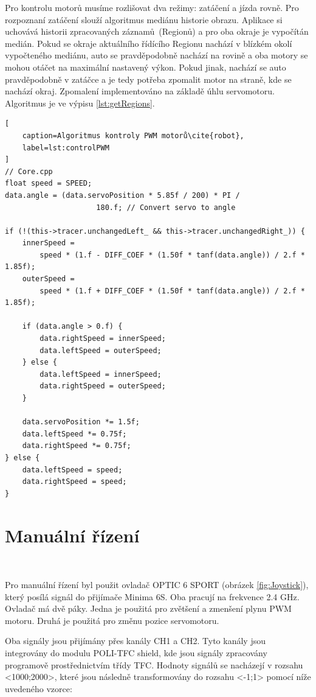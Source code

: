 Pro kontrolu motorů musíme rozlišovat dva režimy: zatáčení a jízda rovně.
Pro rozpoznaní zatáčení slouží algoritmus mediánu historie obrazu.
Aplikace si uchovává historii zpracovaných záznamů~(Regionů) a pro oba
okraje je vypočítán medián. Pokud se okraje aktuálního řídícího Regionu nachází
v blízkém okolí vypočteného mediánu, auto se pravděpodobně
nachází na rovině a oba motory se mohou otáčet na maximální nastavený výkon.
Pokud jinak, nachází se auto pravděpodobně v zatáčce a je tedy potřeba zpomalit
motor na straně, kde se nachází okraj.
Zpomalení implementováno na základě úhlu servomotoru.
Algoritmus je ve výpisu \ref{lst:getRegions}\cite{robot}.
\begin{lstlisting}[
	caption=Algoritmus kontroly PWM motorů\cite{robot},
	label=lst:controlPWM
]
// Core.cpp
float speed = SPEED;
data.angle = (data.servoPosition * 5.85f / 200) * PI /
	                 180.f; // Convert servo to angle

if (!(this->tracer.unchangedLeft_ && this->tracer.unchangedRight_)) {
    innerSpeed =
        speed * (1.f - DIFF_COEF * (1.50f * tanf(data.angle)) / 2.f * 1.85f);
    outerSpeed =
        speed * (1.f + DIFF_COEF * (1.50f * tanf(data.angle)) / 2.f * 1.85f);

    if (data.angle > 0.f) {
        data.rightSpeed = innerSpeed;
        data.leftSpeed = outerSpeed;
    } else {
        data.leftSpeed = innerSpeed;
        data.rightSpeed = outerSpeed;
    }

    data.servoPosition *= 1.5f;
    data.leftSpeed *= 0.75f;
    data.rightSpeed *= 0.75f;
} else {
    data.leftSpeed = speed;
    data.rightSpeed = speed;
}
\end{lstlisting}

\section{Manuální řízení}\

Pro manuální řízení byl použit ovladač OPTIC 6 SPORT (obrázek \ref{fig:Joystick}),
který posílá signál do přijímače Minima 6S.
Oba pracují na frekvence 2.4 GHz. Ovladač má
dvě páky. Jedna je použitá pro zvětšení a zmenšení plynu PWM motoru.
Druhá je použitá pro změnu pozice servomotoru\cite{RC}.

Oba signály jsou přijímány přes kanály CH1 a CH2\cite{RC}.
Tyto kanály jsou integrovány do modulu POLI-TFC shield,
kde jsou signály zpracovány programově prostřednictvím třídy TFC\cite{draha}.
Hodnoty signálů se nacházejí v rozsahu <1000;2000>, které jsou následně
transformovány do rozsahu <-1;1> pomocí níže uvedeného vzorce:

